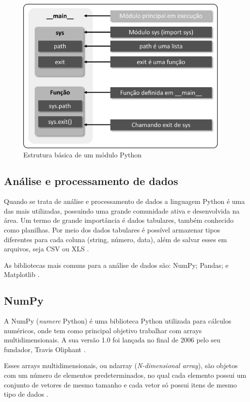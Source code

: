 \begin{figure}[H]
	\centering
	\caption{Estrutura básica de um módulo Python}
	\label{fig:estrutura_modulo}
	\includegraphics[width=10.8cm]{illustrations/figures/estrutura_modulo.pdf}
\end{figure}

\subsection{Análise e processamento de dados}

Quando se trata de análise e processamento de dados a linguagem Python é uma das mais utilizadas, possuindo uma grande comunidade ativa e desenvolvida na área. Um termo de grande importância é dados tabulares, também conhecido como planilhas. Por meio dos dados tabulares é possível armazenar tipos diferentes para cada coluna (string, número, data), além de salvar esses em arquivos, seja CSV ou XLS \cite{ref:mckinney_2022}.

As bibliotecas mais comuns para a análise de dados são: NumPy; Pandas; e Matplotlib \cite{ref:mckinney_2022}.

\subsection{NumPy}

A NumPy (\textit{numerc} Python) é uma biblioteca Python utilizada para cálculos numéricos, onde tem como principal objetivo trabalhar com arrays multidimensionais. A sua versão 1.0 foi lançada no final de 2006 pelo seu fundador, Travis Oliphant \cite{ref:oliphant_2006}.

Esses arrays multidimensionais, ou ndarray (\textit{N-dimensional array}), são objetos com um número de elementos predeterminados, no qual cada elemento possui um conjunto de vetores de mesmo tamanho e cada vetor só possui itens de mesmo tipo de dados \cite{ref:nelli_2023}.

